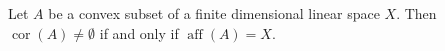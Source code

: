 Let $A$ be a convex subset of a finite dimensional linear space $X$. Then $\operatorname{cor}(A) \neq \emptyset$ if and only if $\operatorname{aff}(A) = X$.
